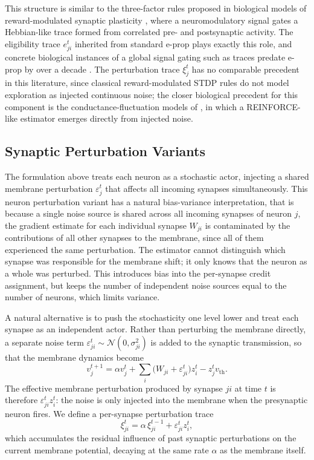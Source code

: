    This structure is similar to the three-factor rules proposed in biological
    models of reward-modulated synaptic plasticity
    \citep{Fremaux2016NeuromodulatedSTDP}, where a neuromodulatory signal
    gates a Hebbian-like trace formed from correlated pre- and postsynaptic
    activity. The eligibility trace $e^t_{ji}$ inherited from standard e-prop
    plays exactly this role, and concrete biological instances of a global
    signal gating such as traces predate e-prop by over a decade
    \citep{Izhikevich2007DistalReward,Florian2007RewardSTDP}. The perturbation
    trace $\xi^t_j$ has no comparable precedent in this literature, since
    classical reward-modulated STDP rules do not model exploration as
    injected continuous noise; the closer biological precedent for this
    component is the conductance-fluctuation models of \citep{fiete2006gradient}, in which a REINFORCE-like estimator emerges directly
    from injected noise.
    
    \subsection{Synaptic Perturbation Variants}
    \label{subsec:synaptic_perturbation}
    
    The formulation above treats each neuron as a stochastic actor, injecting a shared
    membrane perturbation $\varepsilon_j^t$ that affects all incoming synapses
    simultaneously. This neuron perturbation variant has a natural bias-variance
    interpretation, that is because a single noise source is shared across all incoming synapses of
    neuron $j$, the gradient estimate for each individual synapse $W_{ji}$ is contaminated
    by the contributions of all other synapses to the membrane, since all of them
    experienced the same perturbation. The estimator cannot distinguish which synapse was
    responsible for the membrane shift; it only knows that the neuron as a whole was
    perturbed. This introduces bias into the per-synapse credit assignment, but keeps the
    number of independent noise sources equal to the number of neurons, which limits
    variance.
    
    A natural alternative is to push the stochasticity one level lower and treat each
    synapse as an independent actor. Rather than perturbing the membrane directly, a
    separate noise term $\varepsilon_{ji}^t \sim \mathcal{N}(0, \sigma_{ji}^2)$ is added
    to the synaptic transmission, so that the membrane dynamics become
    \[
        v_j^{t+1}
        =
        \alpha v_j^t
        +
        \sum_i \bigl(W_{ji} + \varepsilon_{ji}^t\bigr) z_i^t
        -
        z_j^t v_{\mathrm{th}}.
    \]
    The effective membrane perturbation produced by synapse $ji$ at time $t$ is therefore
    $\varepsilon_{ji}^t z_i^t$: the noise is only injected into the membrane when the
    presynaptic neuron fires. We define a per-synapse perturbation trace
    \[
        \xi_{ji}^t = \alpha\, \xi_{ji}^{t-1} + \varepsilon_{ji}^t z_i^t,
    \]
    which accumulates the residual influence of past synaptic perturbations on the current
    membrane potential, decaying at the same rate $\alpha$ as the membrane itself.
    
